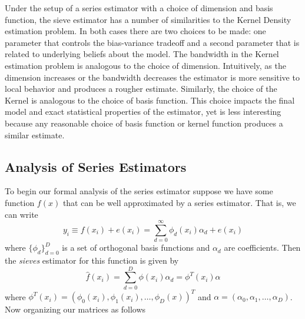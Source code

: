 \documentclass[12pt]{article}  %
\begin{document}
Under the setup of a series estimator with a choice of dimension and basis function, the sieve estimator has a number of similarities to the Kernel Density estimation problem.  In both cases there are two choices to be made: one parameter that controls the bias-variance tradeoff and a second parameter that is related to underlying beliefs about the model.  The bandwidth in the Kernel estimation problem is analogous to the choice of dimension. Intuitively, as the dimension increases or the bandwidth decreases the estimator is more sensitive to local behavior and produces a rougher estimate. Similarly, the choice of the Kernel is analogous to the choice of basis function. This choice impacts the final model and exact statistical properties of the estimator, yet is less interesting because any reasonable choice of basis function or kernel function produces a similar estimate. 

\subsection{Analysis of Series Estimators}

To begin our formal analysis of the series estimator suppose we have some function $f(x)$ that can be well approximated by a series estimator. That is, we can write $$y_i\equiv f(x_i) + e(x_i)= \sum_{d=0}^{\infty}\phi_{d}(x_i)\alpha_d + e(x_i)$$
where $\{\phi_d\}_{d=0}^{D}$ is a set of orthogonal basis functions and $\alpha_d$ are coefficients. Then the \textit{sieves} estimator for this function is given by $$\hat{f}(x_i) = \sum_{d=0}^{D}\phi(x_i)\alpha_{d} = \phi^{T}(x_i)\alpha$$where $\phi^{T}(x_i) = (\phi_{0}(x_i), \phi_{1}(x_i),\ldots, \phi_D(x))^{T}$ and $\alpha = (\alpha_0, \alpha_1, \ldots, \alpha_D)$. Now organizing our matrices as follows 
\end{document}
